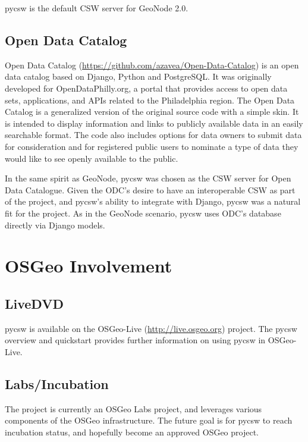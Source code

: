 pycsw is the default CSW server for GeoNode 2.0.

\subsection{Open Data Catalog}
\label{subsec:opendatacatalog}

Open Data Catalog (\url{https://github.com/azavea/Open-Data-Catalog}) is an open data catalog based on Django, Python and  PostgreSQL.  It was originally developed for OpenDataPhilly.org, a portal that provides access to open data sets, applications, and APIs related to the Philadelphia region. The Open Data Catalog is a generalized version of the original source code with a simple skin.  It is intended to display information and links to publicly available data in an easily searchable format. The code also includes options for data owners to submit data for consideration and for registered public users to nominate a type of data they would like to see openly available to the public.

In the same spirit as GeoNode, pycsw was chosen as the CSW server for Open Data Catalogue.  Given the ODC's desire to have an interoperable CSW as part of the project, and pycsw's ability to integrate with Django, pycsw was a natural fit for the project.  As in the GeoNode scenario, pycsw uses ODC's database directly via Django models.

\section{OSGeo Involvement}
\label{sec:osgeo}

\subsection{LiveDVD}
\label{subsec:livedvd}

pycsw is available on the OSGeo-Live (\url{http://live.osgeo.org}) project.  The pycsw overview and quickstart provides further information on using pycsw in OSGeo-Live.

\subsection{Labs/Incubation}
\label{subsec:labs}

The project is currently an OSGeo Labs project, and leverages various components of the OSGeo infrastructure.  The future goal is for pycsw to reach incubation status, and hopefully become an approved OSGeo project.

